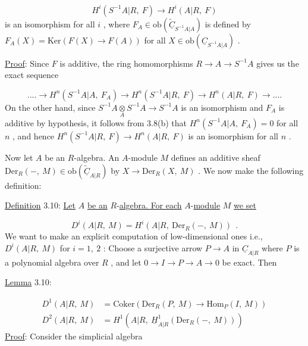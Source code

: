 \begin{equation*}
H^{i}(S^{-1}A|R,\ F) \rightarrow H^{i}(A|R,\ F)
\end{equation*}
is an isomorphism for all  $i$  , where  $F_{A} \in \mathrm{ob}\!\left(\widetilde{\underline{C}}_{S^{-1}A|A}\right)$  is defined by $F_{A}(X) = \mathrm{Ker}(F(X) \rightarrow F(A))$  for all  $X \in \mathrm{ob}\!\left(\underline{C}_{S^{-1}A|A}\right)$  .

\underline{Proof}:  Since  $F$  is additive, the ring homomorphisms  $R \rightarrow A \rightarrow S^{-1}A$  gives us the exact sequence

\begin{equation*}
.... \rightarrow H^{n}(S^{-1}A|A,\ F_{A}) \rightarrow H^{n}(S^{-1}A|R,\ F) \rightarrow H^{n}(A|R,\ F) \rightarrow ....
\end{equation*}
On the other hand, since  $S^{-1}A\underset{A}{\otimes}S^{-1}A \rightarrow S^{-1}A$  is an isomorphism and  $F_{A}$  is additive by hypothesis, it follows from 3.8(b) that  $H^{n}(S^{-1}A|A,\ F_{A}) = 0$  for all  $n$  , and hence  $H^{n}(S^{-1}A|R,\ F) \rightarrow H^{n}(A|R,\ F)$  is an isomorphism for all  $n$  .



Now let  $A$  be an $R$-algebra. An $A$-module  $M$  defines an additive sheaf $\mathrm{Der}_R(-,\ M) \in \mathrm{ob}(\widetilde{\underline{C}}_{A|R})$  by  $X \to \mathrm{Der}_R(X,\ M)$  . We now make the following definition:


\underline{Definition} 3.10:  \underline{Let}  $A$  \underline{be an} $R$-\underline{algebra. For each} $A$-\underline{module}  $M$  \underline{we set}

\begin{equation*}
D^i(A|R,\ M) = H^i(A|R,\ \mathrm{Der}_R(-,\ M)) \ \ .
\end{equation*}
We want to make an explicit computation of low-dimensional ones i.e., $D^i(A|R,\ M)$  for  $i = 1,\ 2$  : Choose a surjective arrow  $P \to A$  in  $\underline{C}_{A|R}$  where  $P$  is a polynomial algebra over  $R$  , and let  $0 \to I \to P \to A \to 0$  be exact. Then


\underline{Lemma} 3.10:

\begin{equation*}
\begin{aligned}
D^1(A|R,\ M) &= \mathrm{Coker}(\mathrm{Der}_R(P,\ M) \to \mathrm{Hom}_P(I,\ M)) \\
D^2(A|R,\ M) &= H^1(A|R,\ \underline{H}^1_{A|R}(\mathrm{Der}_R(-,\ M)))
\end{aligned}
\end{equation*}
\underline{Proof}:  Consider the simplicial algebra

